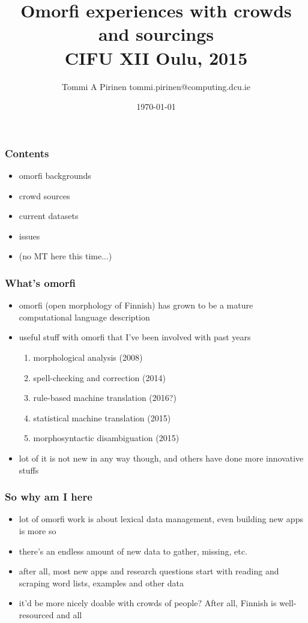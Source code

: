 \documentclass{beamer}
\title{Omorfi experiences with crowds and sourcings\\
\scriptsize{CIFU XII Oulu, 2015}}
\author{Tommi A Pirinen \scriptsize \guilsinglleft{}tommi.pirinen@computing.dcu.ie\guilsinglright{}}
\institute{Ollscoil Chathair Bhaile Átha Cliath, ADAPT Centre\\
EU Marie Curie Abu-MaTran project}
\date{\today}
\begin{document}

\maketitle

\begin{frame}
    \frametitle{Contents}
    \begin{itemize}
        \item omorfi backgrounds
        \item crowd sources
        \item current datasets
        \item issues
        \item (no MT here this time...)
    \end{itemize}
\end{frame}

\begin{frame}
    \frametitle{What's omorfi}
    \begin{itemize}
        \item omorfi (open morphology of Finnish) has grown to be a mature
            computational language description
        \item useful stuff with omorfi that I've been involved with past years
            \begin{enumerate}
                \item morphological analysis (2008)
                \item spell-checking and correction (2014)
                \item rule-based machine translation (2016?)
                \item statistical machine translation (2015)
                \item morphosyntactic disambiguation (2015)
            \end{enumerate}
        \item lot of it is not new in any way though, and others have done
            more innovative stuffs
    \end{itemize}
\end{frame}

\begin{frame}
    \frametitle{So why am I here}
    \begin{itemize}
        \item lot of omorfi work is about lexical data management, even
            building new apps is more so
        \item there's an endless amount of new data to gather, missing, etc.
        \item after all, most new apps and research questions start with
            reading and scraping word lists, examples and other data
        \item it'd be more nicely doable with crowds of people? After all,
            Finnish is well-resourced and all
    \end{itemize}
\end{frame}
\end{document}
